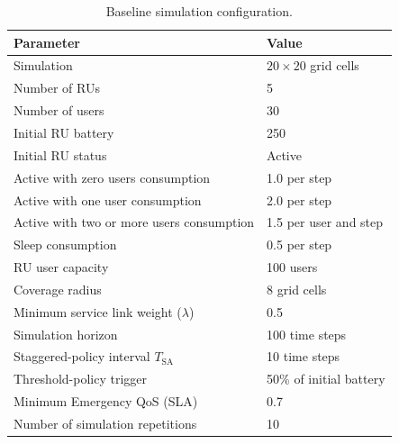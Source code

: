 \begin{table}[!ht]
    \caption{Baseline simulation configuration.}
    \label{tab:baseline-configuration}
    \centering
    \footnotesize
    \setlength{\tabcolsep}{3pt}
    \renewcommand{\arraystretch}{1.1}
    \begin{tabular}{p{} p{}}
        \hline
        \textbf{Parameter} & \textbf{Value} \\
        \hline
        Simulation & \(20\times20\) grid cells \\
        Number of RUs & 5 \\
        Number of users & 30 \\
        Initial RU battery & 250 \\
        Initial RU status & Active \\
        Active with zero users consumption & 1.0 per step \\
        Active with one user consumption & 2.0 per step \\
        Active with two or more users consumption & 1.5 per user and step \\
        Sleep consumption & 0.5 per step \\
        RU user capacity & 100 users \\
        Coverage radius & 8 grid cells \\
        Minimum service link weight ($\lambda$) & 0.5 \\
        Simulation horizon & 100 time steps \\
        Staggered-policy interval \(T_{\mathrm{SA}}\) & 10 time steps \\
        Threshold-policy trigger & 50\% of initial battery \\
        Minimum Emergency QoS (SLA) & 0.7 \\
        Number of simulation repetitions & 10 \\
        \hline
    \end{tabular}
\end{table}
